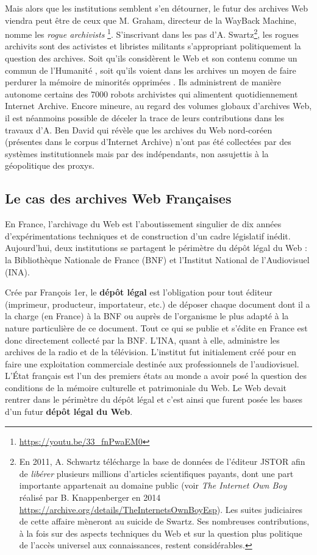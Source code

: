 \documentclass[symmetric,justified,marginals=raggedouter]{tufte-book}
\begin{document}
Mais alors que les institutions semblent s'en détourner, le futur des archives Web viendra peut être de ceux que M. Graham, directeur de la WayBack Machine, nomme les \og \textit{rogue archivists} \fg{}\footnote{\RaggedOuter \url{https://youtu.be/33_fnPwaEM0}}. S'inscrivant dans les pas d'A. Swartz\footnote{\RaggedOuter En 2011, A. Schwartz télécharge la base de données de l'éditeur JSTOR afin de \og \textit{libérer}\fg{} plusieurs millions d'articles scientifiques payants, dont une part importante appartenait au domaine public (voir \textit{The Internet Own Boy} réalisé par B. Knappenberger en 2014 \url{https://archive.org/details/TheInternetsOwnBoyEsp}). Les suites judiciaires de cette affaire mèneront au suicide de Swartz. Ses nombreuses contributions, à la fois sur des aspects techniques du Web et sur la question plus politique de l'accès universel aux connaissances, restent considérables.}, les rogues archivits sont des activistes et libristes militants s'appropriant politiquement la question des archives. Soit qu'ils considèrent le Web et son contenu comme un commun de l'Humanité \citep{coriat_retour_2015}, soit qu'ils voient dans les archives un moyen de faire perdurer la mémoire de minorités opprimées \citep{de_kosnik_rogue_2016}. Ils administrent de manière autonome certains des 7000 robots archivistes qui alimentent quotidiennement Internet Archive. Encore mineure, au regard des volumes globaux d'archives Web, il est néanmoins possible de déceler la trace de leurs contributions dans les travaux d'A. Ben David \citep{ben-david_internet_2018} qui révèle que les archives du Web nord-coréen (présentes dans le corpus d'Internet Archive) n'ont pas été collectées par des systèmes institutionnels mais par des indépendants, non assujettis à la géopolitique des proxys.       

\subsection{Le cas des archives Web Françaises}

\noindent En France, l'archivage du Web est l'aboutissement singulier de dix années d'expérimentations techniques et de construction d'un cadre législatif inédit. Aujourd'hui, deux institutions se partagent le périmètre du dépôt légal du Web : la Bibliothèque Nationale de France (BNF) et l'Institut National de l'Audiovisuel (INA). 

Crée par François 1er, le \textbf{dépôt légal} est l'obligation pour tout éditeur (imprimeur, producteur, importateur, etc.) de déposer chaque document dont il a la charge (en France) à la BNF ou auprès de l'organisme le plus adapté à la nature particulière de ce document. Tout ce qui se publie et s'édite en France est donc directement collecté par la BNF. L'INA, quant à elle, administre les archives de la radio et de la télévision. L'institut fut initialement créé pour en faire une exploitation commerciale destinée aux professionnels de l'audiovisuel. L'État français est l'un des premiers états au monde a avoir posé la question des conditions de la mémoire culturelle et patrimoniale du Web. Le Web devait rentrer dans le périmètre du dépôt légal et c'est ainsi que furent posée les bases d'un futur \textbf{dépôt légal du Web}.
\end{document}

